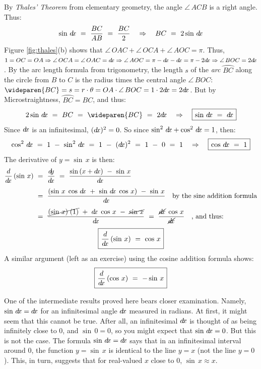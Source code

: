 \noindent By \emph{Thales' Theorem} from elementary
geometry, the angle $\angle\,ACB$ is a right angle. Thus:
\begin{displaymath}
 \sin\,d\!x ~=~ \frac{BC}{AB} ~=~ \frac{BC}{2} \quad\Rightarrow\quad
 BC ~=~ 2\sin\,d\!x
\end{displaymath}
Figure \ref{fig:thales}(b) shows that $\angle\,OAC + \angle\,OCA +
\angle\,AOC = \pi$. Thus, $1=OC=OA \Rightarrow \angle\,OCA = \angle\,OAC = d\!x
\Rightarrow \angle\,AOC = \pi-d\!x-d\!x = \pi-2d\!x \Rightarrow
\angle\,BOC = 2d\!x$.
By the arc length formula from trigonometry, the length $s$ of the
\emph{arc} $\wideparen{BC}$ along the circle from $B$ to $C$ is the
radius times the central angle $\angle\,BOC$: $ \wideparen{BC} = s = r \cdot \theta = OA \cdot \angle\,BOC = 1 \cdot 2\dx
= 2\dx$. But by Microstraightness, $\wideparen{BC} = BC$, and thus:
\begin{displaymath}
 2\sin\,\dx ~=~ BC ~=~ \wideparen{BC} ~=~ 2\dx \quad\Rightarrow\quad
 \setlength{\fboxsep}{4pt}\boxed{\sin\,\dx ~=~ \dx}
\end{displaymath}
Since $d\!x$ is an infinitesimal, $( d\!x )^2 = 0$. So since $\sin^2 \,d\!x +
\cos^2 \,d\!x = 1$, then:
\begin{displaymath}
 \cos^2 \,\dx ~=~ 1 ~-~ \sin^2 \,\dx ~=~ 1 ~-~ ( \dx )^2 ~=~ 1 ~-~ 0 ~=~ 1
 \quad\Rightarrow\quad \setlength{\fboxsep}{4pt}\boxed{\cos\,\dx ~=~ 1}
\end{displaymath}
The derivative of $y=\sin\,x$ is then:
\begin{align*}
 \ddx \,(\sin\,x) ~&=~ \dydx ~=~ \frac{\sin\,(x+\dx) ~-~
  \sin\,x}{\dx}\\[4pt]
 &=~ \frac{(\sin\,x\;\cos\,\dx ~+~ \sin\,\dx\;\cos\,x) ~-~ \sin\,x}{\dx} \quad
  \text{by the sine addition formula}\\[4pt]
 &=~ \frac{\cancel{(\sin\,x)\;(1)} ~+~ \dx\;\cos\,x ~-~ \cancel{\sin\,x}}{\dx}
  ~=~ \frac{\cancel{\dx}\;\cos\,x}{\cancel{\dx}} \quad\text{, and thus:}
 \end{align*}
\begin{displaymath}
 \setlength{\fboxsep}{4pt}\boxed{\ddx \,(\sin\,x) ~=~ \cos\,x}
\end{displaymath}
\newpage
A similar argument (left as an exercise) using the cosine addition formula
shows:
\begin{displaymath}
 \setlength{\fboxsep}{4pt}\boxed{\ddx \,(\cos\,x) ~=~ -\sin\,x}
\end{displaymath}

One of the intermediate results proved here bears closer examination. Namely,
$\sin\,d\!x = d\!x$ for an infinitesimal angle $d\!x$ measured in radians. At
first, it might seem that this cannot be true. After all, an infinitesimal $d\!x$
is thought of as being infinitely close to 0, and $\sin\,0 = 0$, so
you might expect that $\sin\,d\!x = 0$. But this is not the case. The formula
$\sin\,d\!x = d\!x$ says that in an infinitesimal interval around 0, the function
$y=\sin\,x$ is identical to the line $y=x$ (not the line $y=0$). This, in turn,
suggests that for real-valued $x$ close to $0$, $\sin\,x \approx x$.

